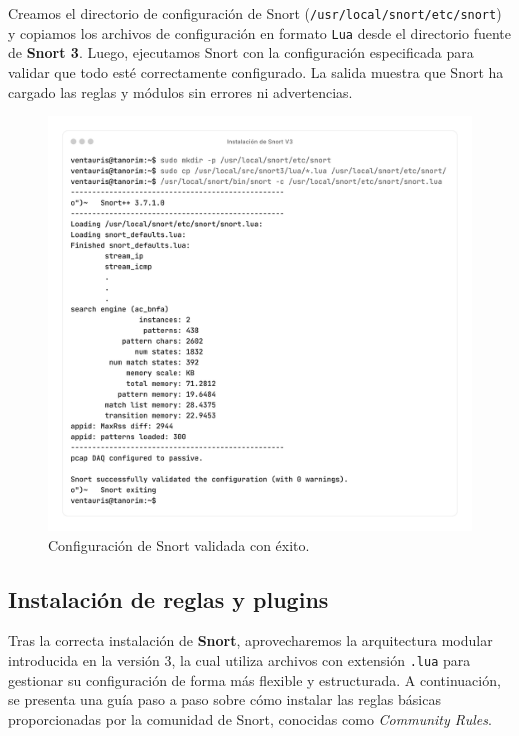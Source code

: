 \documentclass[11pt,a4paper,twoside]{report}
\begin{document}
\newpage

Creamos el directorio de configuración de Snort (\texttt{/usr/local/snort/etc/snort}) y copiamos los archivos de configuración en formato \texttt{Lua} desde el directorio fuente de \textbf{Snort 3}. Luego, ejecutamos Snort con la configuración especificada para validar que todo esté correctamente configurado. La salida muestra que Snort ha cargado las reglas y módulos sin errores ni advertencias.

\begin{figure}[H]
	\centering
	\includegraphics[scale=0.12]{instalacion_snort/25-25.png}
	\caption{Configuración de Snort validada con éxito.}
\end{figure}

\newpage

\subsection{Instalación de reglas y plugins}

Tras la correcta instalación de \textbf{Snort}, aprovecharemos la arquitectura modular introducida en la versión 3, la cual utiliza archivos con extensión \texttt{.lua} para gestionar su configuración de forma más flexible y estructurada. A continuación, se presenta una guía paso a paso sobre cómo instalar las reglas básicas proporcionadas por la comunidad de Snort, conocidas como \textit{Community Rules}.
\end{document}
